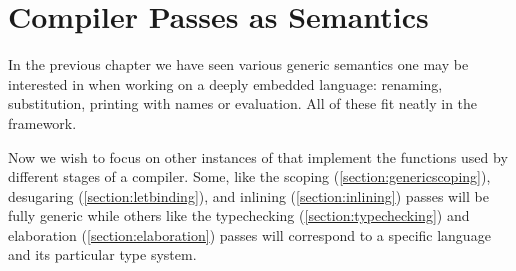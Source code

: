 \chapter{Compiler Passes as Semantics}

In the previous chapter we have seen various generic semantics one may be
interested in when working on a deeply embedded language: renaming,
substitution, printing with names or evaluation. All of these fit neatly
in the  framework.

Now we wish to focus on other instances of  that implement
the functions used by different stages of a compiler. Some, like the
scoping (\cref{section:genericscoping}), desugaring (\cref{section:letbinding}),
and inlining (\cref{section:inlining}) passes will be fully generic
while others like the typechecking (\cref{section:typechecking}) and
elaboration (\cref{section:elaboration}) passes will correspond to a
specific language and its particular type system.






